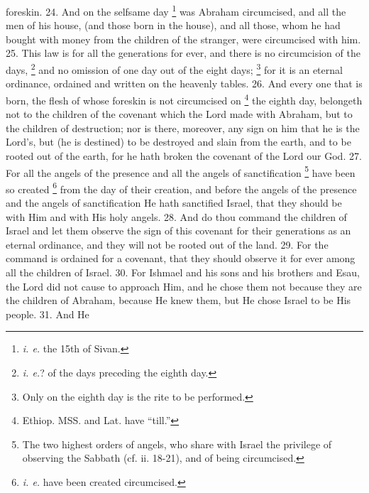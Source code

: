 foreskin. 24. And on the selfsame day \footnote{\emph{i. e.} the 15th of Sivan.} was Abraham circumcised, and all the men of his house, (and those born in the house), and all those, whom he had bought with money from the children of the stranger, were circumcised with him. 25. This law is for all the generations for ever, and there is no circumcision of the days, \footnote{\emph{i. e.}? of the days preceding the eighth day.} and no omission of one day out of the eight days; \footnote{Only on the eighth day is the rite to be performed.} for it is an eternal ordinance, ordained and written on the heavenly tables. 26. And every one that is born, the flesh of whose foreskin is not circumcised on \footnote{Ethiop. MSS. and Lat. have ``till.''} the eighth day, belongeth not to the children of the covenant which the Lord made with Abraham, but to the children of destruction; nor is there, moreover, any sign on him that he is the Lord's, but (he is destined) to be destroyed and slain from the earth, and to be rooted out of the earth, for he hath broken the covenant of the Lord our God. 27. For all the angels of the presence and all the angels of sanctification \footnote{The two highest orders of angels, who share with Israel the privilege of observing the Sabbath (cf. ii. 18-21), and of being circumcised.} have been so created \footnote{\emph{i. e.} have been created circumcised.} from the day of their creation, and before the angels of the presence and the angels of sanctification He hath sanctified Israel, that they should be with Him and with His holy angels. 28. And do thou command the children of Israel and let them observe the sign of this covenant for their generations as an eternal ordinance, and they will not be rooted out of the land. 29. For the command is ordained for a covenant, that they should observe it for ever among all the children of Israel. 30. For Ishmael and his sons and his brothers and Esau, the Lord did not cause to approach Him, and he chose them not because they are the children of Abraham, because He knew them, but He chose Israel to be His people. 31. And He

